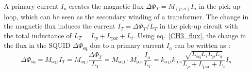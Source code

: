 \documentclass[12pt,a4paper]{report}
\begin{document}
       A primary current \(I_a\) creates the magnetic flux \(\Delta \Phi_T = M_{(p,a)} I_a\) in the pick-up loop, which can be seen as the secondary winding of a transformer. The change in the magnetic flux induces the current \(I_T = \Delta \Phi_T / L_T\) in the pick-up circuit with the total inductance of \(L_T = L_p + L_{\text{par}} + L_i\). Using eq.~\ref{CH3_flux}, the change in the flux in the SQUID \(\Delta \Phi_{\text{sq}}\) due to a primary current \(I_a\) can be written as \cite{CorelessCCC} \cite{Geithner_CCC}:
       \begin{equation}
       	\Delta \Phi_{\text{sq}} = M_{\text{sq,i}} I_T = M_{\text{sq,i}} \frac{\Delta \Phi_T}{L_T} = M_{\text{sq,i}} \cdot M_{\text{p,a}} \frac{I_a}{L_T} 
       	= k_{\text{sq,i}} k_{\text{p,a}} \frac{\sqrt{L_{\text{sq}} L_i L_p L_a}}{L_p + L_{\text{par}} + L_i}  I_a
       	\label{CH3_flux_difference}
       \end{equation}
       
\end{document}
